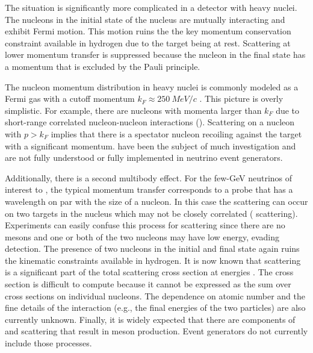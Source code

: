 The situation is significantly more complicated in a detector with heavy nuclei. The nucleons in the initial state of the nucleus are mutually interacting and exhibit Fermi motion. This motion ruins the the key momentum conservation constraint available in hydrogen due to the target being at rest. Scattering at lower momentum transfer is suppressed because the nucleon in the final state has a momentum that is excluded by the Pauli principle. 

The nucleon momentum distribution in heavy nuclei is commonly modeled as a Fermi gas with a cutoff momentum $k_F \approx \SI{250}{MeV/c}$ \cite{Smith:1972xh}.
This picture is overly simplistic.  For example,  there are nucleons with momenta larger than $k_F$ due to short-range correlated nucleon-nucleon interactions ()\cite{Bodek:2014jxa}. Scattering on a nucleon with $p>k_F$ implies that there is a spectator nucleon recoiling against the target with a significant momentum.  have been the subject of much investigation and are not fully understood or fully implemented in neutrino event generators.

Additionally, there is a second multibody effect. For the few-GeV neutrinos of interest to , the typical momentum transfer corresponds to a probe that has a wavelength on par with the size of a nucleon. In this case the scattering can occur on two targets in the nucleus which may not be closely correlated ( scattering). Experiments can easily confuse this process for  scattering since there are no mesons and one or both of the two nucleons may have low energy, evading detection. The presence of two nucleons in the initial and final state again ruins the kinematic constraints available in hydrogen. It is now known that  scattering is a significant part of the total scattering cross section at  energies \cite{Ruterbories:2018gub}. The  cross section is difficult to compute because it cannot be expressed as the sum over cross sections on individual nucleons. The dependence on atomic number and the fine details of the interaction (e.g., the final energies of the two particles) are also currently unknown. Finally, it is widely expected that there are components of  and  scattering that result in meson production. Event generators do not currently include those processes.


